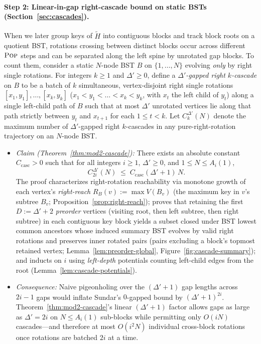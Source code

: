\documentclass[11pt]{article}
\theoremstyle{definition}
\theoremstyle{remark}
\newcommand{\POP}{\textnormal{\scshape Pop}}
\begin{document}
\paragraph{Step 2: Linear-in-gap right-cascade bound on static BSTs (Section~\ref{sec:cascades}).}
When we later group keys of $\widetilde{H}$ into contiguous blocks and track block roots on a quotient BST, rotations crossing between distinct blocks occur across different $\POP$ steps and can be separated along the left spine by unrotated gap blocks. To count them, consider a static $N$-node BST $B$ on $\{1, \dots, N\}$ evolving \emph{only} by right single rotations. For integers $k \ge 1$ and $\Delta' \ge 0$, define a \emph{$\Delta'$-gapped right $k$-cascade} on $B$ to be a batch of $k$ simultaneous, vertex-disjoint right single rotations $[x_1, y_1], \dots, [x_k, y_k]$ ($x_1 < y_1 < \dots < x_k < y_k$, with $x_t$ the left child of $y_t$) along a single left-child path of $B$ such that at most $\Delta'$ unrotated vertices lie along that path strictly between $y_t$ and $x_{t+1}$ for each $1 \le t < k$. Let $C^{\Delta'}_k(N)$ denote the maximum number of $\Delta'$-gapped right $k$-cascades in any pure-right-rotation trajectory on an $N$-node BST.
\begin{itemize}[leftmargin=2em, itemsep=2pt]
  \item \emph{Claim (Theorem~\ref{thm:mod2-cascade}):} There exists an absolute constant $C_{\mathrm{casc}} > 0$ such that for all integers $i \ge 1$, $\Delta' \ge 0$, and $1 \le N \le A_i(1)$,
  \[
  C^{\Delta'}_{2i}(N) \;\le\; C_{\mathrm{casc}}(\Delta' + 1)\,N.
  \]
  The proof characterizes right-rotation reachability via monotone growth of each vertex's \emph{right-reach} $R_B(v) := \max V(B_v)$ (the maximum key in $v$'s subtree $B_v$; Proposition~\ref{prop:right-reach}); proves that retaining the first $D := \Delta' + 2$ \emph{preorder} vertices (visiting root, then left subtree, then right subtree) in each contiguous key block yields a subset closed under BST lowest common ancestors whose induced summary BST evolves by valid right rotations and preserves inner rotated pairs (pairs excluding a block's topmost retained vertex; Lemma~\ref{lem:preorder-global}, Figure~\ref{fig:cascade-summary}); and inducts on $i$ using \emph{left-depth} potentials counting left-child edges from the root (Lemma~\ref{lem:cascade-potentials}).
  \item \emph{Consequence:} Naive pigeonholing over the $(\Delta' + 1)$ gap lengths across $2i - 1$ gaps would inflate Sundar's $0$-gapped bound by $(\Delta' + 1)^{2i}$. Theorem~\ref{thm:mod2-cascade}'s linear $(\Delta' + 1)$ factor allows gaps as large as $\Delta' = 2i$ on $N \le A_i(1)$ sub-blocks while permitting only $O(i N)$ cascades---and therefore at most $O(i^2 N)$ individual cross-block rotations once rotations are batched $2i$ at a time.
\end{itemize}
\end{document}
